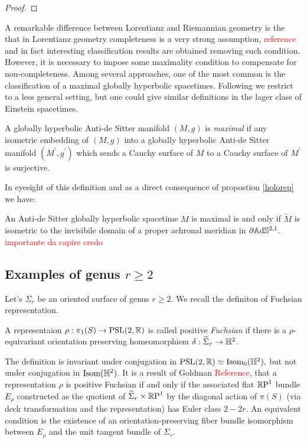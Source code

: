 \begin{proof}
    
\end{proof}

A remarkable difference between Lorentianz and Riemannian geometry is the that in Lorentianz geometry completeness is a very strong assumption, \textcolor{red}{reference} and in fact interesting classification results are obtained removing such condition. However, it is necessary to impose some maximality condition to compensate for non-completeness. Among several  approaches, one of the most common is the classification of a maximal globally hyperbolic spacetimes. Following \cite{bonsanteseppi} we restrict to a less general setting, but one could give similar definitions in the lager class of Einstein spacetimes.

\begin{definition}
    A globally hyperbolic Anti-de Sitter manifold $(M,g)$ is \textit{maximal} if any isometric embedding of $(M,g)$ into a globally hyperbolic Anti-de Sitter manifold $(M^{\prime},g^{\prime})$ which sends a Cauchy surface of $M$ to a Cauchy surface of $M^{\prime}$ is surjective.
\end{definition}

In eyesight of this definition and as a direct consequence of propostion \ref{holorep} we have:

\begin{corollary}
An Anti-de Sitter globally hyperbolic spacetime $M$ is maximal is and only if $\tilde{M}$ is isometric to the invisibile domain of a proper achronal meridian in $\partial\mathbb{A}\mathrm{d}\mathbb{S}^{2,1}.$ \textcolor{red}{importante da capire credo}
\end{corollary}


\subsection{Examples of genus $r\geq 2$}
Let's $\Sigma_r$ be an oriented surface of genus $r\geq 2.$ We recall the definiton of Fuchsian representation. 

\begin{definition}
    A representaion $\rho:\pi_1(S)\to \text{PSL}(2,\mathbb{R})$ is called positive \textit{Fuchsian} if there is a $\rho$-equivariant orientation preserving homeomorphism $\delta:\widetilde{\Sigma}_r\to\mathbb{H}^2$.
\end{definition}

The definition is invariant under conjugation in $\text{PSL}(2,\mathbb{R})\simeq\text{Isom}_0(\mathbb{H}^2),$ but not under conjugation in $\text{Isom}(\mathbb{H}^2).$ It is a result of Goldman \textcolor{red}{Reference}, that a representation $\rho$ is positive Fuchsian if and only if the associated flat $\mathbb{R}\text{P}^1$ bundle $E_\rho$ constructed as the quotient of $\widetilde{\Sigma}_r\times\mathbb{R}\text{P}^1$ by the diagonal action of $\pi(S)$ (via deck transformation and the representation) has Euler class $2-2r.$ An equivalent condition is the existence of an orientation-preserving fiber bundle isomorphism between $E_\rho$ and the unit tangent bundle of $\Sigma_r.$ \\   

